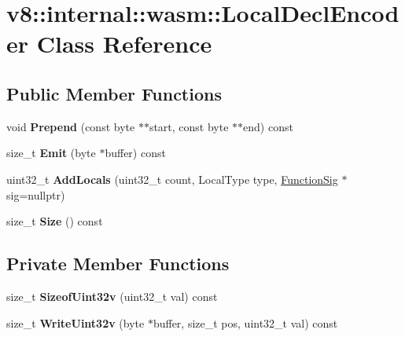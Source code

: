 \hypertarget{classv8_1_1internal_1_1wasm_1_1_local_decl_encoder}{}\section{v8\+:\+:internal\+:\+:wasm\+:\+:Local\+Decl\+Encoder Class Reference}
\label{classv8_1_1internal_1_1wasm_1_1_local_decl_encoder}
\subsection*{Public Member Functions}
\begin{DoxyCompactItemize}
\item 
void {\bfseries Prepend} (const byte $\ast$$\ast$start, const byte $\ast$$\ast$end) const \hypertarget{classv8_1_1internal_1_1wasm_1_1_local_decl_encoder_a26e1e48dda8db90cc80d99052c1d4d20}{}\label{classv8_1_1internal_1_1wasm_1_1_local_decl_encoder_a26e1e48dda8db90cc80d99052c1d4d20}

\item 
size\+\_\+t {\bfseries Emit} (byte $\ast$buffer) const \hypertarget{classv8_1_1internal_1_1wasm_1_1_local_decl_encoder_a4017a65a19ccf6b0e34664275e2cb103}{}\label{classv8_1_1internal_1_1wasm_1_1_local_decl_encoder_a4017a65a19ccf6b0e34664275e2cb103}

\item 
uint32\+\_\+t {\bfseries Add\+Locals} (uint32\+\_\+t count, Local\+Type type, \hyperlink{classv8_1_1internal_1_1_signature}{Function\+Sig} $\ast$sig=nullptr)\hypertarget{classv8_1_1internal_1_1wasm_1_1_local_decl_encoder_aff6a18c0110edf6716cd6a6482b2063a}{}\label{classv8_1_1internal_1_1wasm_1_1_local_decl_encoder_aff6a18c0110edf6716cd6a6482b2063a}

\item 
size\+\_\+t {\bfseries Size} () const \hypertarget{classv8_1_1internal_1_1wasm_1_1_local_decl_encoder_a2394a67d0718bb9d0c7333b258f50e82}{}\label{classv8_1_1internal_1_1wasm_1_1_local_decl_encoder_a2394a67d0718bb9d0c7333b258f50e82}

\end{DoxyCompactItemize}
\subsection*{Private Member Functions}
\begin{DoxyCompactItemize}
\item 
size\+\_\+t {\bfseries Sizeof\+Uint32v} (uint32\+\_\+t val) const \hypertarget{classv8_1_1internal_1_1wasm_1_1_local_decl_encoder_aa7b38e21109c1b0e66e6c8223a3051a2}{}\label{classv8_1_1internal_1_1wasm_1_1_local_decl_encoder_aa7b38e21109c1b0e66e6c8223a3051a2}

\item 
size\+\_\+t {\bfseries Write\+Uint32v} (byte $\ast$buffer, size\+\_\+t pos, uint32\+\_\+t val) const \hypertarget{classv8_1_1internal_1_1wasm_1_1_local_decl_encoder_a711a3fb2349e9dc7a82a910ec9b13f4d}{}\label{classv8_1_1internal_1_1wasm_1_1_local_decl_encoder_a711a3fb2349e9dc7a82a910ec9b13f4d}

\end{DoxyCompactItemize}
